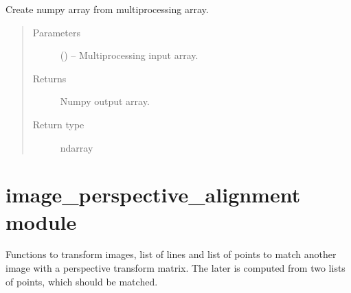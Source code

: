 \documentclass[letterpaper,10pt,english]{sphinxmanual}
\begin{document}

\begin{fulllineitems}
\label{\detokenize{image_morphing:image_morphing.to_numpy_array}}
Create numpy array from multiprocessing array.
\begin{quote}\begin{description}
\item[{Parameters}] \leavevmode
{} () -- Multiprocessing input array.

\item[{Returns}] \leavevmode
Numpy output array.

\item[{Return type}] \leavevmode
ndarray

\end{description}\end{quote}

\end{fulllineitems}



\chapter{image\_perspective\_alignment module}
\label{\detokenize{image_perspective_alignment:image-perspective-alignment-module}}\label{\detokenize{image_perspective_alignment::doc}}\label{\detokenize{image_perspective_alignment:module-image_perspective_alignment}}
Functions to transform images, list of lines and list of points to match
another image with a perspective transform matrix. The later is computed from
two lists of points, which should be matched.
\end{document}
